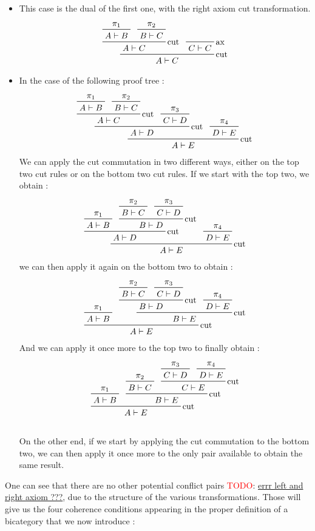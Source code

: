 \documentclass[a4paper, 12pt, twoside,openright]{report}
\newcommand{\todo}[1]{\textcolor{red}{TODO}: \underline{#1}}
\begin{document}
\begin{itemize}
\begin{itemize}
\item This case is the dual of the first one, with the right axiom cut transformation.
$$\prftree[r]{cut}
	{ \prftree[r]{cut}
		{\prftree{\pi_1}{A \vdash B}
		}
		{\prftree{\pi_2}{B \vdash C}
		}
		{A \vdash C}
	}
	{\prftree[r]{ax}{C \vdash C}
	}
	{A \vdash C}
$$
\item In the case of the following proof tree : 
$$
\prftree[r]{cut}
	{\prftree[r]{cut}
		{\prftree[r]{cut}
			{\prftree{\pi_1}{A \vdash B}}
			{\prftree{\pi_2}{B\vdash C}}
			{A \vdash C}
		}
		{\prftree{\pi_3}{C \vdash D}}
		{A \vdash D}
	}
	{\prftree{\pi_4}{D\vdash E}}
	{A \vdash E}
$$
We can apply the cut commutation in two different ways, either on the top two cut rules or on the bottom two cut rules. If we start with the top two, we obtain : 
$$
\prftree[r]{cut}
	{\prftree[r]{cut}
		{\prftree{\pi_1}{A \vdash B}}
		{\prftree[r]{cut}
			{\prftree{\pi_2}{B \vdash C}}
			{\prftree{\pi_3}{C\vdash D}}
			{B \vdash D}
		}
		{A \vdash D}	
	}
	{\prftree{\pi_4}{D\vdash E}}
	{A \vdash E}
$$
we can then apply it again on the bottom two to obtain : 
$$
\prftree[r]{cut}
	{\prftree{\pi_1}{A\vdash B}}
	{\prftree[r]{cut}
		{\prftree[r]{cut}
			{\prftree{\pi_2}{B \vdash C}}
			{\prftree{\pi_3}{C\vdash D}}
			{B \vdash D}
		}
		{\prftree{\pi_4}{D \vdash E}}
		{B \vdash E}	
	}
	{A \vdash E}
$$
And we can apply it once more to the top two to finally obtain : 
$$
\prftree[r]{cut}
	{\prftree{\pi_1}{A\vdash B}}
	{\prftree[r]{cut}
		{\prftree{\pi_2}{B \vdash C}}
		{\prftree[r]{cut}
			{\prftree{\pi_3}{C \vdash D}}
			{\prftree{\pi_4}{D\vdash E}}
			{C \vdash E}
		}
		{B \vdash E}	
	}
	{A \vdash E}
$$
\\
On the other end, if we start by applying the cut commutation to the bottom two, we can then apply it once more to the only pair available to obtain the same result.
\end{itemize}
One can see that there are no other potential conflict pairs \todo{errr left and right axiom ???}, due to the structure of the various transformations. Those will give us the four coherence conditions appearing in the proper definition of a bicategory that we now introduce : 

\end{itemize}
\end{document}
